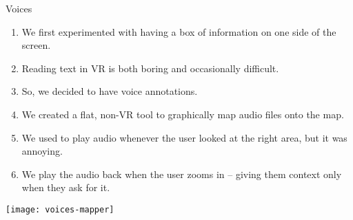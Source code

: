 \documentclass{beamer}
\begin{document}
\begin{frame}{Voices}
	\begin{enumerate}
		\item We first experimented with having a box of information on one side of the screen.
		\item Reading text in VR is both boring and occasionally difficult.
		\item So, we decided to have voice annotations. 
		\item We created a flat, non-VR tool to
			graphically map audio files onto the map.
		\item We used to play audio whenever the user looked at the right area, but it was
			annoying.
		\item We play the audio back when the user zooms in -- giving them context only
			when they ask for it.
	\end{enumerate}
	\texttt{[image: voices-mapper]}
\end{frame}
\end{document}
